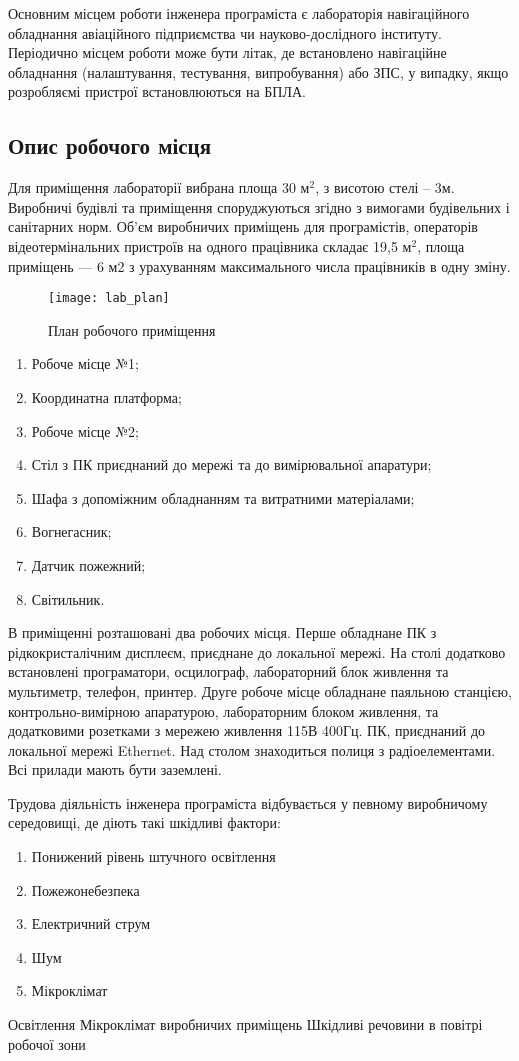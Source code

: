 Основним місцем роботи інженера програміста є лабораторія навігаційного обладнання авіаційного підприємства чи науково-дослідного інституту. Періодично місцем роботи може бути літак, де встановлено навігаційне обладнання (налаштування, тестування, випробування) або ЗПС, у випадку, якщо розробляємі пристрої встановлюються на БПЛА.

\subsection{Опис робочого місця}
Для приміщення лабораторії вибрана площа 30 $\text{м}^2$, з висотою стелі -- 3м. Виробничі будівлі та приміщення споруджуються згідно з вимогами будівельних і санітарних норм. Об’єм виробничих приміщень для програмістів, операторів відеотермінальних пристроїв на одного працівника складає 19,5 $\text{м}^2$, площа приміщень — 6 м2 з урахуванням максимального числа працівників в одну зміну. 

\begin{figure}[H]
\centering
\texttt{[image: lab\_plan]}
\caption{План робочого приміщення}\label{fig:lab_plan}
\end{figure}

\begin{enumerate}
 \item Робоче місце №1;
 \item Координатна платформа;
 \item Робоче місце №2;
 \item Стіл з ПК приєднаний до мережі та до вимірювальної апаратури;
 \item Шафа з допоміжним обладнанням та витратними матеріалами;
 \item Вогнегасник;
 \item Датчик пожежний;
 \item Світильник.
\end{enumerate}

В приміщенні розташовані два робочих місця. Перше обладнане ПК з рідкокристалічним дисплеєм, приєднане до локальної мережі. На столі додатково встановлені програматори, осцилограф, лабораторний блок живлення та мультиметр, телефон, принтер. Друге робоче місце обладнане паяльною станцією, контрольно-вимірною апаратурою, лабораторним блоком живлення, та додатковими розетками з мережею живлення 115В 400Гц. ПК, приєднаний до локальної мережі Ethernet. Над столом знаходиться полиця з радіоелементами. Всі прилади мають бути заземлені.

Трудова діяльність інженера програміста відбувається у певному виробничому середовищі, де діють такі шкідливі фактори: 
\begin{enumerate}
  \item Понижений рівень штучного освітлення 
  \item Пожежонебезпека
  \item Електричний струм
  \item Шум
  \item Мікроклімат
\end{enumerate}
Освітлення
Мікроклімат виробничих приміщень
Шкідливі речовини в повітрі робочої зони

